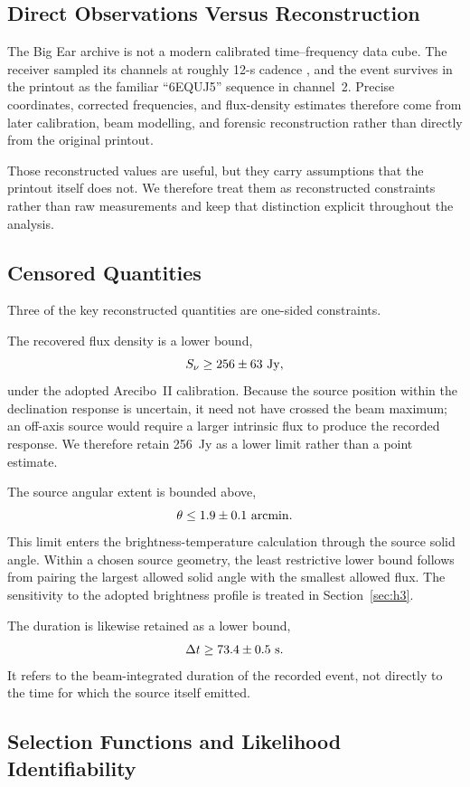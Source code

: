 \documentclass[crop]{CSL}
\newcommand{\snu}{S_\nu}
\begin{document}
\subsection{Direct Observations Versus Reconstruction}

The Big Ear archive is not a modern calibrated time--frequency data cube. The receiver sampled its channels at roughly 12-s cadence \citep{mendez2024}, and the event survives in the printout as the familiar ``6EQUJ5'' sequence in channel~2. Precise coordinates, corrected frequencies, and flux-density estimates therefore come from later calibration, beam modelling, and forensic reconstruction rather than directly from the original printout.

Those reconstructed values are useful, but they carry assumptions that the printout itself does not. We therefore treat them as reconstructed constraints rather than raw measurements and keep that distinction explicit throughout the analysis.

\subsection{Censored Quantities}

Three of the key reconstructed quantities are one-sided constraints.

The recovered flux density is a lower bound,
\[
\snu\geq256\pm63~{\rm Jy},
\]
under the adopted Arecibo~II calibration. Because the source position within the declination response is uncertain, it need not have crossed the beam maximum; an off-axis source would require a larger intrinsic flux to produce the recorded response. We therefore retain 256~Jy as a lower limit rather than a point estimate.

The source angular extent is bounded above,
\[
\theta\leq1.9\pm0.1~{\rm arcmin}.
\]
This limit enters the brightness-temperature calculation through the source solid angle. Within a chosen source geometry, the least restrictive lower bound follows from pairing the largest allowed solid angle with the smallest allowed flux. The sensitivity to the adopted brightness profile is treated in Section~\ref{sec:h3}.

The duration is likewise retained as a lower bound,
\[
\Delta t\geq73.4\pm0.5~{\rm s}.
\]
It refers to the beam-integrated duration of the recorded event, not directly to the time for which the source itself emitted.

\subsection{Selection Functions and Likelihood Identifiability}
\end{document}

